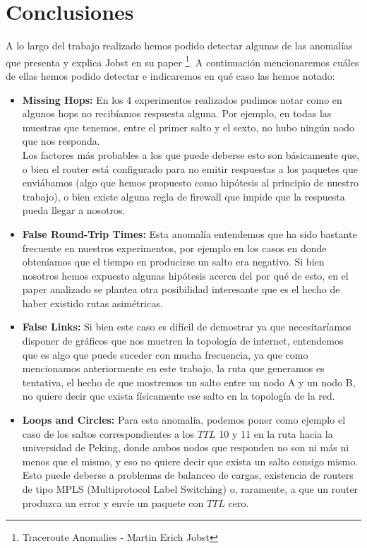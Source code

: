 \section{Conclusiones}


A lo largo del trabajo realizado hemos podido detectar algunas de las anomalías que presenta y explica Jobst en su paper \footnote{Traceroute Anomalies - Martin Erich Jobst}.
A continuación mencionaremos cuáles de ellas hemos podido detectar e indicaremos en qué caso las hemos notado:

\begin{itemize}
	\item \textbf{Missing Hops:} En los 4 experimentos realizados pudimos notar como en algunos hops no recibíamos respuesta alguna. Por ejemplo, en todas las muestras que tenemos, entre el primer salto y el sexto, no hubo ningún nodo que nos responda. \\
	Los factores más probables a los que puede deberse esto son básicamente que, o bien el router está configurado para no emitir respuestas a los paquetes que enviábamos (algo que hemos propuesto como hipótesis al principio de nuestro trabajo), o bien existe alguna regla de firewall que impide que la respuesta pueda llegar a nosotros.
	
	\item \textbf{False Round-Trip Times:} Esta anomalía entendemos que ha sido bastante frecuente en nuestros experimentos, por ejemplo en los casos en donde obteníamos que el tiempo en producirse un salto era negativo. Si bien nosotros hemos expuesto algunas hipótesis acerca del por qué de esto, en el paper analizado se plantea otra posibilidad interesante que es el hecho de haber existido rutas asimétricas.
	
	\item \textbf{False Links:} Si bien este caso es difícil de demostrar ya que necesitaríamos disponer de gráficos que nos muetren la topología de internet, entendemos que es algo que puede suceder con mucha frecuencia, ya que como mencionamos anteriormente en este trabajo, la ruta que generamos es tentativa, el hecho de que mostremos un salto entre un nodo A y un nodo B, no quiere decir que exista físicamente ese salto en la topología de la red.
	
	\item \textbf{Loops and Circles:}	Para esta anomalía, podemos poner como ejemplo el caso de los saltos correspondientes a los $TTL$ 10 y 11 en la ruta hacia la universidad de Peking, donde ambos nodos que responden no son ni más ni menos que el mismo, y eso no quiere decir que exista un salto consigo mismo. Esto puede deberse a problemas de balanceo de cargas, existencia de routers de tipo MPLS (Multiprotocol Label Switching) o, raramente, a que un router produzca un error y envíe un paquete con $TTL$ cero.
	
\end{itemize}

